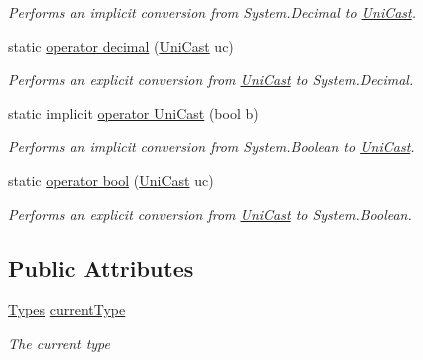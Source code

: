 \begin{DoxyCompactItemize}
\begin{DoxyCompactList}\small\item\em Performs an implicit conversion from System.\+Decimal to \hyperlink{class_lerp2_a_p_i_1_1_game_1_1_uni_cast}{Uni\+Cast}. \end{DoxyCompactList}\item 
static \hyperlink{class_lerp2_a_p_i_1_1_game_1_1_uni_cast_a2782d1b407078b98690a2cebf3d57d2a}{operator decimal} (\hyperlink{class_lerp2_a_p_i_1_1_game_1_1_uni_cast}{Uni\+Cast} uc)
\begin{DoxyCompactList}\small\item\em Performs an explicit conversion from \hyperlink{class_lerp2_a_p_i_1_1_game_1_1_uni_cast}{Uni\+Cast} to System.\+Decimal. \end{DoxyCompactList}\item 
static implicit \hyperlink{class_lerp2_a_p_i_1_1_game_1_1_uni_cast_ae717aec495e87ed6c8c18f050c9804b6}{operator Uni\+Cast} (bool b)
\begin{DoxyCompactList}\small\item\em Performs an implicit conversion from System.\+Boolean to \hyperlink{class_lerp2_a_p_i_1_1_game_1_1_uni_cast}{Uni\+Cast}. \end{DoxyCompactList}\item 
static \hyperlink{class_lerp2_a_p_i_1_1_game_1_1_uni_cast_a6d5fd929df01248a2ed22391713691a5}{operator bool} (\hyperlink{class_lerp2_a_p_i_1_1_game_1_1_uni_cast}{Uni\+Cast} uc)
\begin{DoxyCompactList}\small\item\em Performs an explicit conversion from \hyperlink{class_lerp2_a_p_i_1_1_game_1_1_uni_cast}{Uni\+Cast} to System.\+Boolean. \end{DoxyCompactList}\end{DoxyCompactItemize}
\subsection*{Public Attributes}
\begin{DoxyCompactItemize}
\item 
\hyperlink{namespace_lerp2_a_p_i_1_1_game_a2f182da062f210cc43f341f6992ee293}{Types} \hyperlink{class_lerp2_a_p_i_1_1_game_1_1_uni_cast_a5b53b8fda4168d5797db9498b52687ef}{current\+Type}
\begin{DoxyCompactList}\small\item\em The current type \end{DoxyCompactList}\end{DoxyCompactItemize}


